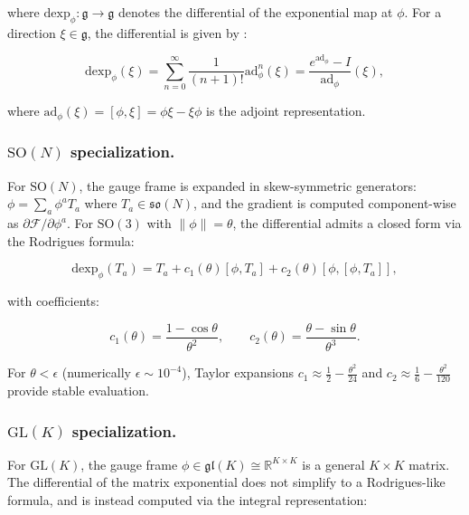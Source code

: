\documentclass[twoside,11pt]{article}
\begin{document}
where $\mathrm{dexp}_\phi: \mathfrak{g} \to \mathfrak{g}$ denotes the differential of the exponential map at $\phi$. For a direction $\xi \in \mathfrak{g}$, the differential is given by \citep{gallier2020differential,rossmann2002lie}:

\begin{equation}
\mathrm{dexp}_\phi(\xi) = \sum_{n=0}^{\infty} \frac{1}{(n+1)!} \mathrm{ad}_\phi^n(\xi) = \frac{e^{\mathrm{ad}_\phi} - I}{\mathrm{ad}_\phi}(\xi),
\label{eq:dexp_series}
\end{equation}

where $\mathrm{ad}_\phi(\xi) = [\phi, \xi] = \phi\xi - \xi\phi$ is the adjoint representation.

\subsubsection{$\mathrm{SO}(N)$ specialization.}

For $\mathrm{SO}(N)$, the gauge frame is expanded in skew-symmetric generators: $\phi = \sum_a \phi^a T_a$ where $T_a \in \mathfrak{so}(N)$, and the gradient is computed component-wise as $\partial \mathcal{F}/\partial \phi^a$. For $\mathrm{SO}(3)$ with $\|\phi\| = \theta$, the differential admits a closed form via the Rodrigues formula:

\begin{equation}
\mathrm{dexp}_\phi(T_a) = T_a + c_1(\theta)[\phi, T_a] + c_2(\theta)[\phi, [\phi, T_a]],
\label{eq:dexp_so3}
\end{equation}

with coefficients:

\begin{equation}
c_1(\theta) = \frac{1 - \cos\theta}{\theta^2}, \qquad c_2(\theta) = \frac{\theta - \sin\theta}{\theta^3}.
\end{equation}

For $\theta < \epsilon$ (numerically $\epsilon \sim 10^{-4}$), Taylor expansions $c_1 \approx \frac{1}{2} - \frac{\theta^2}{24}$ and $c_2 \approx \frac{1}{6} - \frac{\theta^2}{120}$ provide stable evaluation.

\subsubsection{$\mathrm{GL}(K)$ specialization.}

For $\mathrm{GL}(K)$, the gauge frame $\phi \in \mathfrak{gl}(K) \cong \mathbb{R}^{K \times K}$ is a general $K \times K$ matrix. The differential of the matrix exponential does not simplify to a Rodrigues-like formula, and is instead computed via the integral representation:
\end{document}
